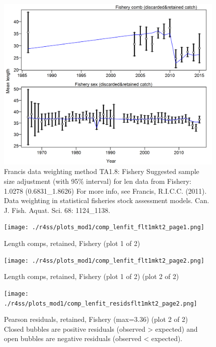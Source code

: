 \documentclass[12pt,]{article}
\begin{document}
\begin{figure}
\centering
\includegraphics{./r4ss/plots_mod1/comp_lenfit_data_weighting_TA1.8_Fishery.png}
\caption{Francis data weighting method TA1.8: Fishery Suggested sample
size adjustment (with 95\% interval) for len data from Fishery: 1.0278
(0.6831\_1.8626) For more info, see Francis, R.I.C.C. (2011). Data
weighting in statistical fisheries stock assessment models. Can. J.
Fish. Aquat. Sci. 68: 1124\_1138.
\label{fig:mod1_4_comp_lenfit_data_weighting_TA1.8_Fishery}}
\end{figure}

\begin{figure}
\centering
\texttt{[image: ./r4ss/plots\_mod1/comp\_lenfit\_flt1mkt2\_page1.png]}
\caption{Length comps, retained, Fishery (plot 1 of 2)
\label{fig:mod1_5_comp_lenfit_flt1mkt2_page1}}
\end{figure}

\begin{figure}
\centering
\texttt{[image: ./r4ss/plots\_mod1/comp\_lenfit\_flt1mkt2\_page2.png]}
\caption{Length comps, retained, Fishery (plot 1 of 2) (plot 2 of 2)
\label{fig:mod1_6_comp_lenfit_flt1mkt2_page2}}
\end{figure}

\begin{figure}
\centering
\texttt{[image: ./r4ss/plots\_mod1/comp\_lenfit\_residsflt1mkt2\_page2.png]}
\caption{Pearson residuals, retained, Fishery (max=3.36) (plot 2 of 2)\\
Closed bubbles are positive residuals (observed \textgreater{} expected)
and open bubbles are negative residuals (observed \textless{} expected).
\label{fig:mod1_7_comp_lenfit_residsflt1mkt2_page2}}
\end{figure}
\end{document}
